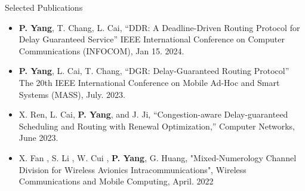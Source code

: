 \documentclass[]{puyang-resume}
\begin{document}


\begin{section}{Selected Publications}
    \begin{itemize}
        \item \textbf{P. Yang}, T. Chang, L. Cai, “DDR: A Deadline-Driven Routing Protocol for Delay Guaranteed Service” IEEE International Conference on Computer Communications (INFOCOM), Jan 15. 2024.
        \item \textbf{P. Yang}, L. Cai, T. Chang, “DGR: Delay-Guaranteed Routing Protocol” The 20th IEEE International Conference on Mobile Ad-Hoc and Smart Systems (MASS), July. 2023.
        
        \item X. Ren, L. Cai, \textbf{P. Yang}, and J. Ji, “Congestion-aware Delay-guaranteed Scheduling and Routing with Renewal Optimization,” Computer Networks, June 2023.

        \item X. Fan , S. Li , W. Cui , \textbf{P. Yang}, G. Huang, "Mixed-Numerology Channel Division for Wireless Avionics Intracommunications", Wireless Communications and Mobile Computing, April. 2022

    \end{itemize}
\end{section}
\end{document}
